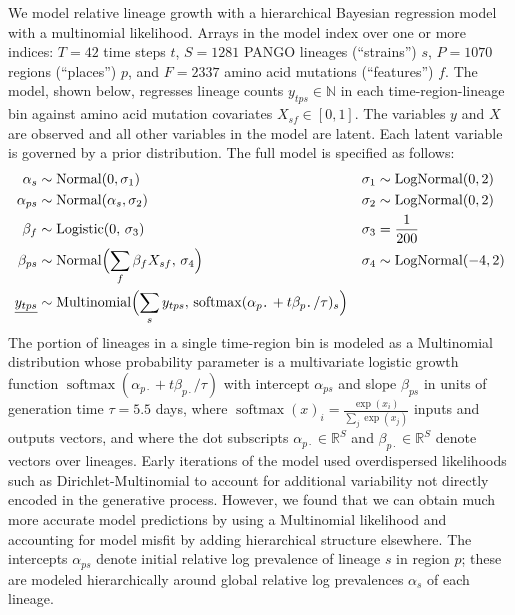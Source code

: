 \documentclass[12pt]{article}
\newcommand \blank {{\,\pmb\cdot\,}}
\begin{document}
We model relative lineage growth with a hierarchical Bayesian regression model with a multinomial likelihood.
Arrays in the model index over one or more indices: $T{=}42$ time steps $t$, $S{=}1281$ PANGO lineages (``strains'') $s$, $P{=}1070$ regions (``places'') $p$, and $F{=}2337$ amino acid mutations (``features'') $f$.
The model, shown below, regresses lineage counts $y_{tps}\in\mathbb N$ in each time-region-lineage bin against amino acid mutation covariates $X_{sf} \in [0,1]$.
The variables $y$ and $X$ are observed and all other variables in the model are latent. Each latent variable is governed by a prior distribution.
The full model is specified as follows:
\begin{align*}
  \textstyle
  \alpha_s &\sim \operatorname{Normal}(0, \sigma_1) &
  \sigma_1 &\sim \operatorname{LogNormal}(0, 2) \\
  \alpha_{ps} &\sim \operatorname{Normal}(\alpha_s, \sigma_2) &
  \sigma_2 &\sim \operatorname{LogNormal}(0, 2) \\
  \beta_f &\sim \operatorname{Logistic}(0,\, \sigma_3) &
  \sigma_3 &= \frac{1}{200} \\
  \beta_{ps} &\sim \operatorname{Normal}\Bigl(
   \sum_f \beta_f X_{sf},\, \sigma_4
  \Bigr) &
  \sigma_4 &\sim \operatorname{LogNormal}(-4, 2) \\
  \underline{y_{tps}} &\sim \operatorname{Multinomial}\Bigl(
    \sum_s y_{tps},\, \operatorname{softmax}(\alpha_{p\blank} + t\beta_{p\blank}/\tau)_s
  \Bigr)
\end{align*}
The portion of lineages in a single time-region bin is modeled as a Multinomial distribution whose probability parameter is a multivariate logistic growth function $\operatorname{softmax}(\alpha_{p\blank} + t\beta_{p\blank}/\tau)$ with intercept $\alpha_{ps}$ and slope $\beta_{ps}$ in units of generation time $\tau=5.5$ days, where
${
  \operatorname{softmax}(x)_i = \frac {\exp(x_i)} {\sum_j \exp(x_j)}
}$
inputs and outputs vectors, and where the dot subscripts $\alpha_{p\blank}\in\mathbb R^S$ and $\beta_{p\blank}\in\mathbb R^S$ denote vectors over lineages.
Early iterations of the model used overdispersed likelihoods such as Dirichlet-Multinomial to account for additional variability not directly encoded in the generative process.
However, we found that we can obtain much more accurate model predictions by using a Multinomial likelihood and accounting for model misfit by adding hierarchical structure elsewhere.
The intercepts $\alpha_{ps}$ denote initial relative log prevalence of lineage $s$ in region $p$; these are modeled hierarchically around global relative log prevalences $\alpha_s$ of each lineage.
\end{document}
